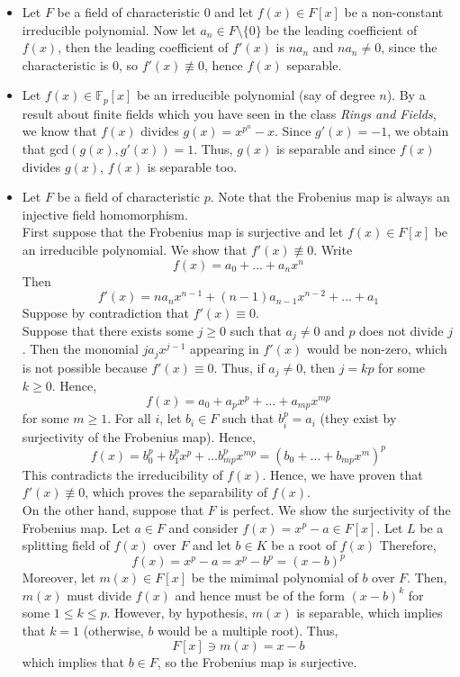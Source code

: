 \documentclass[12pt,a4paper]{article}
\begin{document}
\begin{itemize}	
	\item Let $F$ be a field of characteristic $0$ and let $f(x) \in F[x]$ be a non-constant irreducible polynomial. Now let $a_n \in F \setminus \{0\}$ be the leading coefficient of $f(x)$, then the leading coefficient of $f'(x)$ is $na_n$ and $na_n \neq 0$, since the characteristic is 0, so $f'(x) \not\equiv 0$, hence $f(x)$ separable.
	\item Let $f(x) \in \mathbb{F}_p[x]$ be an irreducible polynomial (say of degree $n$). By a result about finite fields which you have seen in the class \textit{Rings and Fields}, we know that $f(x)$ divides $g(x) = x^{p^n} - x$. Since $g'(x) = -1$, we obtain that gcd$(g(x), g'(x)) = 1$. Thus, $g(x)$ is separable and since $f(x)$ divides $g(x)$, $f(x)$ is separable too.
	\item Let $F$ be a field of characteristic $p$. Note that the Frobenius map is always an injective field homomorphism. \\
	First suppose that the Frobenius map is surjective and let $f(x) \in F[x]$ be an irreducible polynomial. We show that $f'(x) \not\equiv 0$. Write \[ f(x) = a_0 + \dots + a_nx^n \] Then \[ f'(x) = na_nx^{n - 1} + (n - 1) a_{n - 1}x^{n - 2} + \dots + a_1 \] Suppose by contradiction that $f'(x) \equiv 0$. \\ Suppose that there exists some $j \geq 0$ such that $a_j \neq 0$ and $p$ does not divide $j$. Then the monomial $ja_jx^{j - 1}$ appearing in $f'(x)$ would be non-zero, which is not possible because $f'(x) \equiv 0$. Thus, if $a_j \neq 0$, then $j = kp$ for some $k \geq 0$. Hence, \[ f(x) = a_0 + a_px^p + \dots + a_{mp}x^{mp} \] for some $m \geq 1$. For all $i$, let $b_i \in F$ such that $b_i^p = a_i$ (they exist by surjectivity of the Frobenius map). Hence, \[ f(x) = b_0^p + b_1^px^p + \dots b_{mp}^px^{mp} = (b_0 + \dots + b_{mp}x^m)^p \] This contradicts the irreducibility of $f(x)$. Hence, we have proven that $f'(x) \not\equiv 0$, which proves the separability of $f(x)$. \\
	On the other hand, suppose that $F$ is perfect. We show the surjectivity of the Frobenius map. Let $a \in F$ and consider $f(x) = x^p - a \in F[x]$. Let $L$ be a splitting field of $f(x)$ over $F$ and let $b \in K$ be a root of $f(x)$ Therefore, \[ f(x) = x^p - a = x^p - b^p = (x - b)^p \] Moreover, let $m(x) \in F[x]$ be the mimimal polynomial of $b$ over $F$. Then, $m(x)$ must divide $f(x)$ and hence must be of the form $(x - b)^k$ for some $1 \leq k \leq p$. However, by hypothesis, $m(x)$ is separable, which implies that $k = 1$ (otherwise, $b$ would be a multiple root). Thus, \[ F[x] \ni m(x) = x - b \] which implies that $b \in F$, so the Frobenius map is surjective.

\end{itemize}
\end{document}
